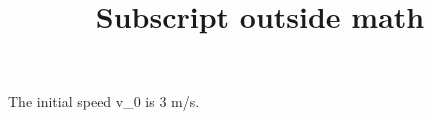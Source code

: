 \documentclass{handout}
\title{Subscript outside math}
\begin{document}
\maketitle
The initial speed v_0 is 3 m/s.
\end{document}
